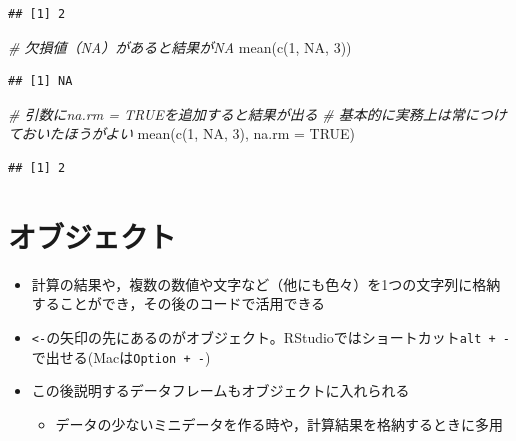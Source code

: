 \documentclass[
  xelatex,ja=standard, b5paper]{bxjsbook}
\newenvironment{Shaded}{\begin{snugshade}}{\end{snugshade}}
\newcommand{\AttributeTok}[1]{\textcolor[rgb]{0.77,0.63,0.00}{#1}}
\newcommand{\CommentTok}[1]{\textcolor[rgb]{0.56,0.35,0.01}{\textit{#1}}}
\newcommand{\ConstantTok}[1]{\textcolor[rgb]{0.00,0.00,0.00}{#1}}
\newcommand{\DecValTok}[1]{\textcolor[rgb]{0.00,0.00,0.81}{#1}}
\newcommand{\FunctionTok}[1]{\textcolor[rgb]{0.00,0.00,0.00}{#1}}
\newcommand{\NormalTok}[1]{#1}
\providecommand{\tightlist}{%
  \setlength{\itemsep}{0pt}\setlength{\parskip}{0pt}}
\begin{document}
\begin{verbatim}
## [1] 2
\end{verbatim}

\begin{Shaded}
\begin{Highlighting}[]
\CommentTok{\# 欠損値（NA）があると結果がNA}
\FunctionTok{mean}\NormalTok{(}\FunctionTok{c}\NormalTok{(}\DecValTok{1}\NormalTok{, }\ConstantTok{NA}\NormalTok{, }\DecValTok{3}\NormalTok{))}
\end{Highlighting}
\end{Shaded}

\begin{verbatim}
## [1] NA
\end{verbatim}

\begin{Shaded}
\begin{Highlighting}[]
\CommentTok{\# 引数にna.rm = TRUEを追加すると結果が出る}
\CommentTok{\# 基本的に実務上は常につけておいたほうがよい}
\FunctionTok{mean}\NormalTok{(}\FunctionTok{c}\NormalTok{(}\DecValTok{1}\NormalTok{, }\ConstantTok{NA}\NormalTok{, }\DecValTok{3}\NormalTok{), }\AttributeTok{na.rm =} \ConstantTok{TRUE}\NormalTok{)}
\end{Highlighting}
\end{Shaded}

\begin{verbatim}
## [1] 2
\end{verbatim}

\hypertarget{p-object}{%
\section{オブジェクト}\label{p-object}}

\begin{itemize}
\tightlist
\item
  計算の結果や，複数の数値や文字など（他にも色々）を1つの文字列に格納することができ，その後のコードで活用できる
\item
  \texttt{\textless{}-}の矢印の先にあるのがオブジェクト。RStudioではショートカット\texttt{alt\ +\ -}で出せる(Macは\texttt{Option\ +\ -})
\item
  この後説明するデータフレームもオブジェクトに入れられる

  \begin{itemize}
  \tightlist
  \item
    データの少ないミニデータを作る時や，計算結果を格納するときに多用
  \end{itemize}
\end{itemize}
\end{document}
